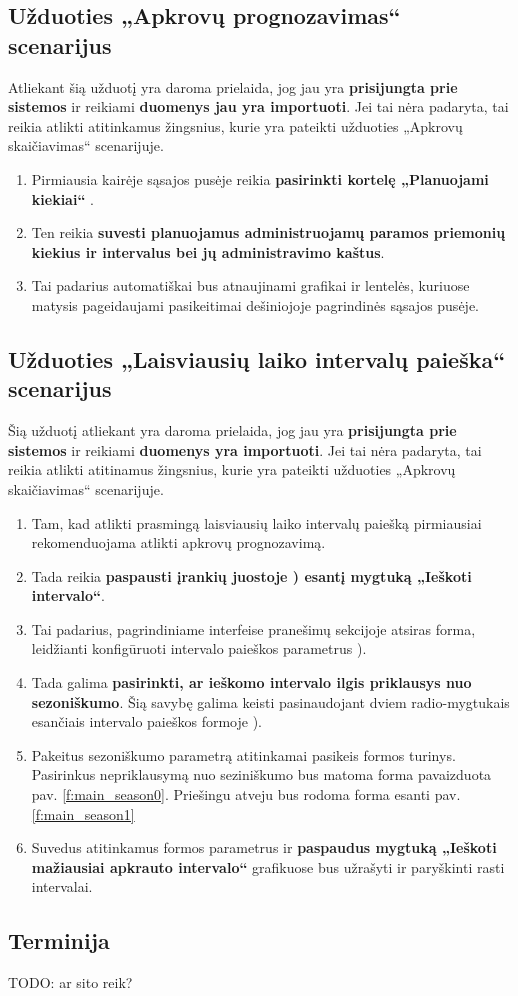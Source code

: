 
\subsection{Užduoties „Apkrovų prognozavimas“ scenarijus}

Atliekant šią užduotį yra daroma prielaida, jog jau yra
\textbf{prisijungta prie sistemos} ir reikiami \textbf{duomenys jau yra
importuoti}. Jei tai nėra padaryta, tai reikia atlikti atitinkamus
žingsnius, kurie yra pateikti užduoties „Apkrovų skaičiavimas“
scenarijuje.

\begin{enumerate}
  \item Pirmiausia kairėje sąsajos pusėje reikia \textbf{pasirinkti
    kortelę „Planuojami kiekiai“} .
  \item Ten reikia \textbf{suvesti planuojamus administruojamų paramos
    priemonių kiekius ir intervalus bei jų administravimo kaštus}.
  \item Tai padarius automatiškai bus atnaujinami grafikai ir
    lentelės, kuriuose matysis pageidaujami pasikeitimai dešiniojoje
    pagrindinės sąsajos  pusėje.
\end{enumerate}

\subsection{Užduoties „Laisviausių laiko intervalų paieška“ scenarijus}
Šią užduotį atliekant yra daroma prielaida, jog jau yra \textbf{prisijungta prie sistemos} ir reikiami \textbf{duomenys yra importuoti}. Jei tai nėra padaryta, tai reikia atlikti atitinamus žingsnius, kurie yra pateikti užduoties „Apkrovų skaičiavimas“ scenarijuje.

\begin{enumerate}
  \item Tam, kad atlikti prasmingą laisviausių laiko intervalų paiešką pirmiausiai rekomenduojama atlikti apkrovų prognozavimą.
  \item Tada reikia \textbf{paspausti įrankių juostoje ) esantį mygtuką „Ieškoti intervalo“}.
  \item Tai padarius, pagrindiniame interfeise pranešimų sekcijoje atsiras forma, leidžianti konfigūruoti intervalo paieškos parametrus ).
  \item Tada galima \textbf{pasirinkti, ar ieškomo intervalo ilgis priklausys nuo sezoniškumo}. Šią savybę galima keisti pasinaudojant dviem radio-mygtukais esančiais intervalo paieškos formoje ).
  \item Pakeitus sezoniškumo parametrą atitinkamai pasikeis formos turinys. Pasirinkus nepriklausymą nuo seziniškumo bus matoma forma pavaizduota pav. \ref{f:main_season0}. Priešingu atveju bus rodoma forma esanti pav. \ref{f:main_season1}
  \item Suvedus atitinkamus formos parametrus ir \textbf{paspaudus mygtuką „Ieškoti mažiausiai apkrauto intervalo“} grafikuose bus užrašyti ir paryškinti rasti intervalai.
\end{enumerate}


\subsection{Terminija}
TODO: ar sito reik?
